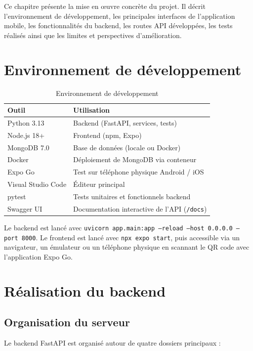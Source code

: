 \documentclass[12pt,a4paper]{report}
\begin{document}
Ce chapitre présente la mise en œuvre concrète du projet. Il décrit l'environnement de développement, les principales interfaces de l'application mobile, les fonctionnalités du backend, les routes API développées, les tests réalisés ainsi que les limites et perspectives d'amélioration.

\section{Environnement de développement}

\begin{table}[H]
\centering
\begin{tabularx}{\textwidth}{|p{4cm}|X|}
\hline
\textbf{Outil} & \textbf{Utilisation}\\
\hline
Python 3.13 & Backend (FastAPI, services, tests)\\
\hline
Node.js 18+ & Frontend (npm, Expo)\\
\hline
MongoDB 7.0 & Base de données (locale ou Docker)\\
\hline
Docker & Déploiement de MongoDB via conteneur\\
\hline
Expo Go & Test sur téléphone physique Android / iOS\\
\hline
Visual Studio Code & Éditeur principal\\
\hline
pytest & Tests unitaires et fonctionnels backend\\
\hline
Swagger UI & Documentation interactive de l'API (\texttt{/docs})\\
\hline
\end{tabularx}
\caption{Environnement de développement}
\label{tab:env}
\end{table}

Le backend est lancé avec \texttt{uvicorn app.main:app --reload --host 0.0.0.0 --port 8000}. Le frontend est lancé avec \texttt{npx expo start}, puis accessible via un navigateur, un émulateur ou un téléphone physique en scannant le QR code avec l'application Expo Go.

\section{Réalisation du backend}

\subsection{Organisation du serveur}

Le backend FastAPI est organisé autour de quatre dossiers principaux :
\end{document}
